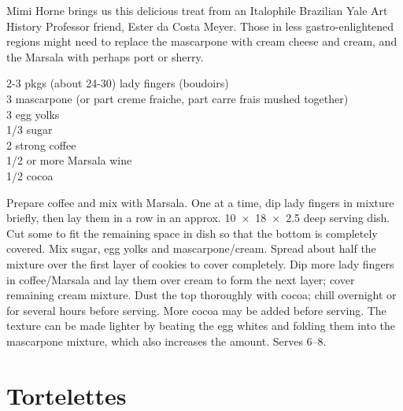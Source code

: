 \begin{open}
  Mimi Horne brings us this delicious treat from an Italophile Brazilian
  Yale Art History Professor friend, Ester da Costa Meyer.  Those in less
  gastro-enlightened regions might need to replace the mascarpone with cream
  cheese and cream, and the Marsala with perhaps port or sherry.
\end{open}
\begin{ingredients}
  2-3 pkgs (about 24-30) lady fingers (boudoirs) \\
  \SI{3}{\cup} mascarpone (or part creme fraiche, part carre frais mushed together)\\
  3 egg yolks \\
  \SI{1/3}{\cup} sugar \\
  \SI{2}{\cup} strong coffee \\
  \SI{1/2}{\cup} or more Marsala wine \\
  \SI{1/2}{\cup} cocoa
\end{ingredients}
Prepare coffee and mix with Marsala. One at a time, dip lady fingers in
mixture briefly, then lay them in a row in an approx. \SI{10x18x2.5}{\inch}
deep serving dish.  Cut some to fit the remaining space in dish so that the
bottom is completely covered. Mix sugar, egg yolks and
mascarpone/cream. Spread about half the mixture over the first layer of
cookies to cover completely.  Dip more lady fingers in coffee/Marsala and lay
them over cream to form the next layer; cover remaining cream mixture. Dust
the top thoroughly with cocoa; chill overnight or for several hours before
serving. More cocoa may be added before serving. The texture can be made
lighter by beating the egg whites and folding them into the mascarpone
mixture, which also increases the amount.  Serves \numrange{6}{8}.

\section{Tortelettes}


